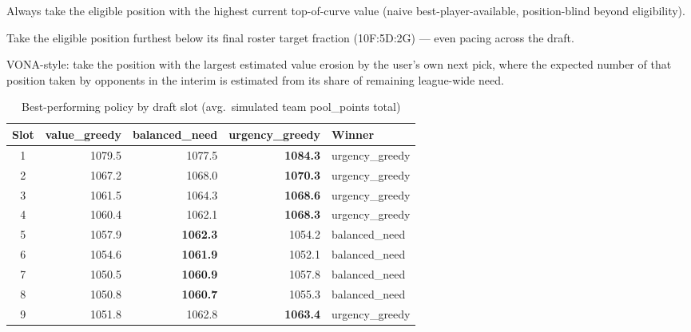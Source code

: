 \documentclass[11pt, a4paper]{article}
\begin{document}
\begin{description}[leftmargin=3cm, style=nextline]
  \item[\texttt{value\_greedy}] Always take the eligible position with the highest current
        top-of-curve value (naive best-player-available, position-blind beyond eligibility).
  \item[\texttt{balanced\_need}] Take the eligible position furthest below its final roster
        target fraction (10F:5D:2G) — even pacing across the draft.
  \item[\texttt{urgency\_greedy}] VONA-style: take the position with the largest estimated value
        erosion by the user's own next pick, where the expected number of that position taken by
        opponents in the interim is estimated from its share of remaining league-wide need.
\end{description}

\begin{table}[h]
\centering
\caption{Best-performing policy by draft slot (avg.\ simulated team pool\_points total)}
\label{tab:policywinner}
\begin{tabular}{crrrl}
\toprule
Slot & value\_greedy & balanced\_need & urgency\_greedy & Winner \\
\midrule
1 & 1079.5 & 1077.5 & \textbf{1084.3} & urgency\_greedy \\
2 & 1067.2 & 1068.0 & \textbf{1070.3} & urgency\_greedy \\
3 & 1061.5 & 1064.3 & \textbf{1068.6} & urgency\_greedy \\
4 & 1060.4 & 1062.1 & \textbf{1068.3} & urgency\_greedy \\
5 & 1057.9 & \textbf{1062.3} & 1054.2 & balanced\_need \\
6 & 1054.6 & \textbf{1061.9} & 1052.1 & balanced\_need \\
7 & 1050.5 & \textbf{1060.9} & 1057.8 & balanced\_need \\
8 & 1050.8 & \textbf{1060.7} & 1055.3 & balanced\_need \\
9 & 1051.8 & 1062.8 & \textbf{1063.4} & urgency\_greedy \\
\bottomrule
\end{tabular}
\end{table}
\end{document}
